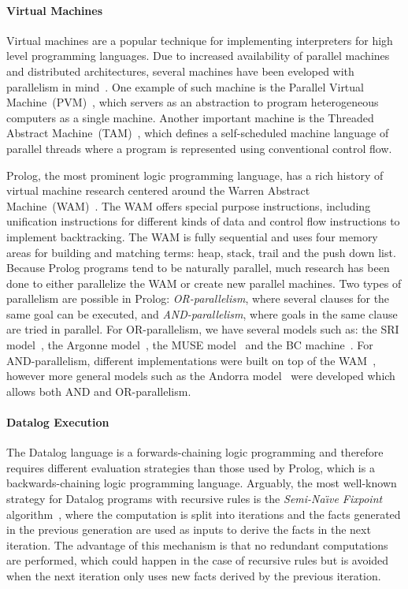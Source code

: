 \paragraph{Virtual Machines}

Virtual machines are a popular technique for implementing interpreters for high
level programming languages. Due to increased availability of parallel machines
and distributed architectures, several machines have been eveloped with
parallelism in mind~\cite{Kara:1997:AMM:265274}. One example of such machine is
the Parallel Virtual Machine~(PVM)~\cite{Sunderam90pvm:a}, which servers as an
abstraction to program heterogeneous computers as a single machine. Another
important machine is the Threaded Abstract
Machine~(TAM)~\cite{CullerGSvE93,goldstein-tr94}, which defines a self-scheduled
machine language of parallel threads where a program is represented using
conventional control flow.

Prolog, the most prominent logic programming language, has a rich history of
virtual machine research centered around the Warren Abstract
Machine~(WAM)~\cite{AICPub641:1983}. The WAM offers special purpose
instructions, including unification instructions for different kinds of data and
control flow instructions to implement backtracking. The WAM is fully sequential
and uses four memory areas for building and matching terms: heap, stack, trail
and the push down list. Because Prolog programs tend to be naturally parallel,
much research has been done to either parallelize the WAM or create new parallel
machines. Two types of parallelism are possible in Prolog:
\emph{OR-parallelism}, where several clauses for the same goal can be executed,
and \emph{AND-parallelism}, where goals in the same clause are tried in
parallel. For OR-parallelism, we have several models such as: the SRI
model~\cite{Warren:1987:OEM:67683.67699}, the Argonne
model~\cite{ButlerDLOOS88}, the MUSE model~\cite{Ali:1990fk} and the BC
machine~\cite{Ali88}. For AND-parallelism, different implementations were built
on top of the WAM~\cite{Hermenegildo:1986:AMB:913061,Lin:1988:AEL:900478},
however more general models such as the Andorra
model~\cite{Haridi:1990:KAP:87961.87964} were developed which allows both AND
and OR-parallelism.

\paragraph{Datalog Execution} The Datalog language is a forwards-chaining logic
programming and therefore requires different evaluation strategies than those
used by Prolog, which is a backwards-chaining logic programming language.
Arguably, the most well-known strategy for Datalog programs with recursive rules
is the \emph{Semi-Na\"{\i}ve Fixpoint}
algorithm~\cite{Balbin:1987:GDA:34657.34661}, where the computation is split
into iterations and the facts generated in the previous generation are used as
inputs to derive the facts in the next iteration. The advantage of this
mechanism is that no redundant computations are performed, which could happen in
the case of recursive rules but is avoided when the next iteration only uses new
facts derived by the previous iteration.
   
